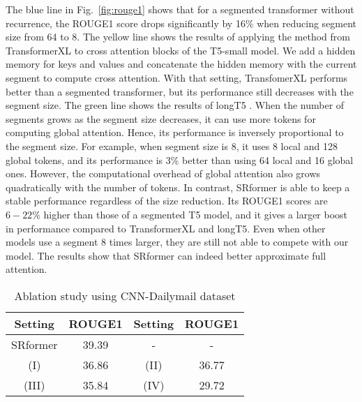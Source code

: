 \documentclass[11pt]{article}
\begin{document}
The blue line in Fig.~\ref{fig:rouge1} shows that for a segmented transformer without recurrence, the ROUGE1 score drops significantly by 16\% when reducing segment size from 64 to 8.  The yellow line shows the results of applying the method from TransformerXL \citep{transformerxl} to cross attention blocks of the T5-small model.
We add a hidden memory for keys and values  and concatenate the hidden memory with the current segment to compute cross attention. With that setting, TransfomerXL performs better than a segmented transformer, but its performance still decreases with the segment size. The green line shows the results of longT5 \cite{longt5}. When the number of segments grows as the segment size decreases, it can use more tokens for computing global attention. Hence, its performance is inversely proportional to the segment size. For example, when segment size is 8, it uses 8 local and 128 global tokens, and its performance is 3\% better than using 64 local and 16 global ones. However, the computational overhead of global attention also grows quadratically with the number of tokens. In contrast, SRformer is able to keep a stable performance regardless of the size reduction. Its ROUGE1 scores are $6-22\%$ higher than those of a segmented T5 model, and it gives a larger boost in performance compared to TransformerXL and longT5. Even when other models use a segment 8 times larger, they are still not able to compete with our model. The results show that SRformer can indeed better approximate full attention.
\begin{table}[h]
    \centering
    \begin{tabular}{c|c|c|c}
       \hline
       Setting  &  ROUGE1 & Setting  &  ROUGE1\\
       \hline
       SRformer & 39.39 & -& -\\
        (I) & 36.86 & (II) & 36.77 \\
        (III) &  35.84 & (IV) &  29.72\\
       \hline
    \end{tabular}
    \caption{Ablation study using CNN-Dailymail dataset}
    \label{tab:ablation}
\end{table}
\end{document}
